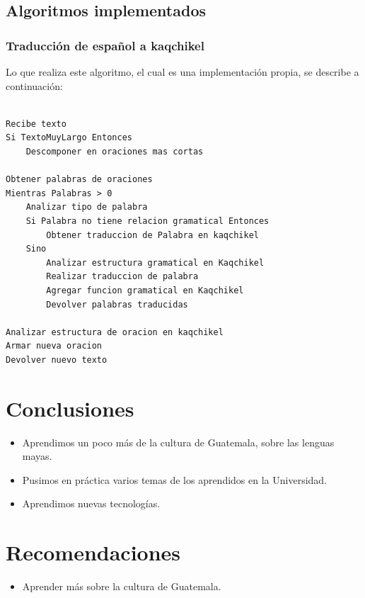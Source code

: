 \documentclass[a4paper,openright,11pt]{article}
\begin{document}
\subsection{Algoritmos implementados}
\subsubsection{Traducción de español a kaqchikel}
Lo que realiza este algoritmo, el cual es una implementación propia, se describe a continuación:

\begin{lstlisting}

Recibe texto
Si TextoMuyLargo Entonces
	Descomponer en oraciones mas cortas
	
Obtener palabras de oraciones
Mientras Palabras > 0
	Analizar tipo de palabra
	Si Palabra no tiene relacion gramatical Entonces
		Obtener traduccion de Palabra en kaqchikel
	Sino
		Analizar estructura gramatical en Kaqchikel
		Realizar traduccion de palabra
		Agregar funcion gramatical en Kaqchikel
		Devolver palabras traducidas
	
Analizar estructura de oracion en kaqchikel
Armar nueva oracion
Devolver nuevo texto

\end{lstlisting}
\newpage

\section{Conclusiones}
\begin{itemize}
	\item Aprendimos un poco más de la cultura de Guatemala, sobre las lenguas mayas.
	\item Pusimos en práctica varios temas de los aprendidos en la Universidad.
	\item Aprendimos nuevas tecnologías.
\end{itemize}
\newpage

\section{Recomendaciones}
\begin{itemize}
	\item Aprender más sobre la cultura de Guatemala.
\end{itemize}
\newpage
\end{document}
